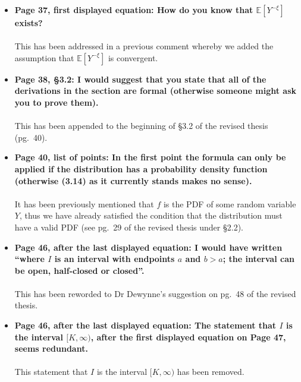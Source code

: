 \documentclass{article}
\begin{document}
\begin{enumerate}
\begin{itemize}
			\item{\textbf{Page 37, first displayed equation: How do you know that $\mathbb{E}[Y^{-\xi}]$ exists?
			\\\\}}
			This has been addressed in a previous comment whereby we added the assumption that $\mathbb{E}[Y^{-\xi}]$ is convergent.
			
			\item{\textbf{Page 38, \S3.2:  I would suggest that you state that all of the derivations in the section are formal (otherwise someone might ask you to prove them).
			\\\\}}
			This has been appended to the beginning of \S3.2 of the revised thesis (pg.~40).
			
			\item{\textbf{Page 40, list of points:  In the first point the formula can only be applied if the distribution has a probability density function (otherwise (3.14) as it currently stands makes no sense).
			\\\\}}
			It has been previously mentioned that $f$ is the PDF of some random variable $Y$, thus we have already satisfied the condition that the distribution must have a valid PDF (see pg.~29 of the revised thesis under \S2.2).
			
			\item{\textbf{Page 46, after the last displayed equation: I would have written ``where $I$ is an interval with endpoints $a$ and $b > a$; the interval can be open, half-closed or closed''.
			\\\\}}
			This has been reworded to Dr Dewynne's suggestion on pg.~48 of the revised thesis.
			
			\item{\textbf{Page 46, after the last displayed equation:  The statement that $I$ is the interval $[K,\infty)$, after the first displayed equation on Page 47, seems redundant.
			\\\\}}
			This statement that $I$ is the interval $[K,\infty)$ has been removed.
			

\end{itemize}
\end{enumerate}
\end{document}

